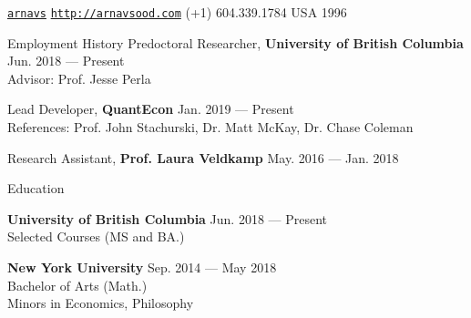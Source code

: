 \documentclass{resume} %
\begin{document}
 \href{https://github.com/arnavs}{\tt arnavs} \vline \hspace{0.5 em} {} \href{http://arnavsood.com}{\tt http://arnavsood.com} \vline \hspace{0.5 em}  (+1) 604.339.1784 \vline \hspace{0.5 em}  USA \vline \hspace{0.5 em}  1996

\begin{rSection}{Employment History}
Predoctoral Researcher, {\bf University of British Columbia} \hfill {Jun. 2018 --- Present} 
\\ Advisor: Prof. Jesse Perla \smallskip 

Lead Developer, {\bf QuantEcon} \hfill {Jan. 2019 --- Present}
\\ References: Prof. John Stachurski, Dr. Matt McKay, Dr. Chase Coleman

Research Assistant, {\bf Prof. Laura Veldkamp} \hfill {May. 2016 --- Jan. 2018}
\end{rSection}


\begin{rSection}{Education}

{\bf University of British Columbia} \hfill {Jun. 2018 --- Present} 
\\ Selected Courses (MS and BA.)  %

{\bf New York University} \hfill {Sep. 2014 --- May 2018} 
\\ Bachelor of Arts (Math.) %
\\ Minors in Economics, Philosophy 
\end{rSection}
\end{document}

